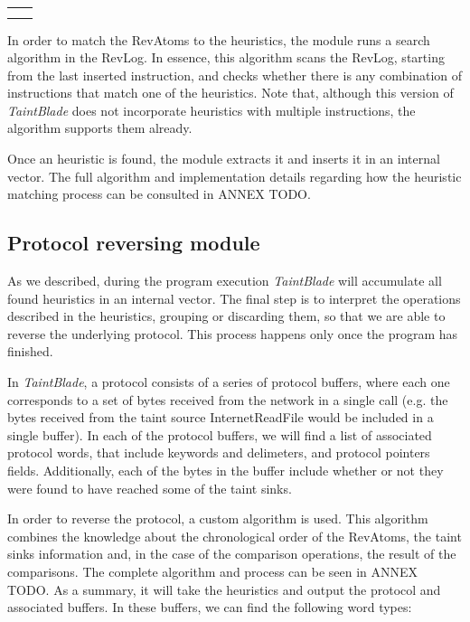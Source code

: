 \documentclass[conference]{IEEEtran}
\begin{document}
\begin{table}[htbp]
\begin{center}
\begin{tabular}{|>{\centering\arraybackslash}p{1.5cm}|>{\centering\arraybackslash}p{6.3cm}|}
                               &                                                                       \\
                               &                                                                       \\
            \hline
        \end{tabular}
        \label{tab1}
    \end{center}
    \label{table:implemented_heuristics}
\end{table}

In order to match the RevAtoms to the heuristics, the module runs a search
algorithm in the RevLog. In essence, this algorithm scans the RevLog, starting
from the last inserted instruction, and checks whether there is any combination
of instructions that match one of the heuristics. Note that, although this
version of \textit{TaintBlade} does not incorporate heuristics with multiple
instructions, the algorithm supports them already.

Once an heuristic is found, the module extracts it and inserts it in an
internal vector. The full algorithm and implementation details regarding how
the heuristic matching process can be consulted in ANNEX TODO.

\subsection{Protocol reversing module}
As we described, during the program execution \textit{TaintBlade} will
accumulate all found heuristics in an internal vector. The final step is to
interpret the operations described in the heuristics, grouping or discarding
them, so that we are able to reverse the underlying protocol. This process
happens only once the program has finished.

In \textit{TaintBlade}, a protocol consists of a series of protocol buffers,
where each one corresponds to a set of bytes received from the network in a
single call (e.g. the bytes received from the taint source InternetReadFile
would be included in a single buffer). In each of the protocol buffers, we will
find a list of associated protocol words, that include keywords and delimeters,
and protocol pointers fields. Additionally, each of the bytes in the buffer
include whether or not they were found to have reached some of the taint sinks.

In order to reverse the protocol, a custom algorithm is used. This algorithm
combines the knowledge about the chronological order of the RevAtoms, the taint
sinks information and, in the case of the comparison operations, the result of
the comparisons. The complete algorithm and process can be seen in ANNEX TODO.
As a summary, it will take the heuristics and output the protocol and
associated buffers. In these buffers, we can find the following word types:
\end{document}
